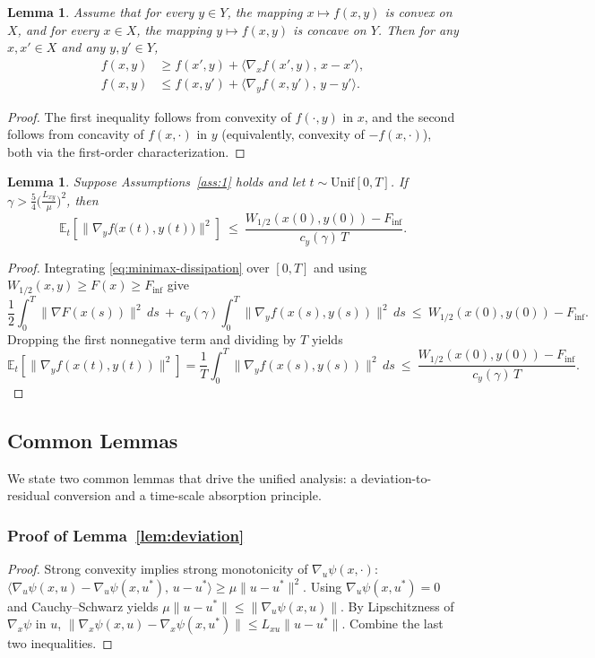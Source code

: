\documentclass{article}
\newtheorem{lemma}[theorem]{Lemma}
\newcommand{\1}{\mathbf{1}}
\begin{document}
\begin{lemma}\label{lem:support}
Assume that for every $y\in Y$, the mapping $x\mapsto f(x,y)$ is convex on $X$,
and for every $x\in X$, the mapping $y\mapsto f(x,y)$ is concave on $Y$.
Then for any $x,x'\in X$ and any $y,y'\in Y$,
\begin{align}
f(x,y) &\ge f(x',y)+\big\langle \nabla_x f(x',y),\,x-x'\big\rangle,
\label{eq:support-x}\\
f(x,y) &\le f(x,y')+\big\langle \nabla_y f(x,y'),\,y-y'\big\rangle.
\label{eq:support-y}
\end{align}
\end{lemma}

\begin{proof}
The first inequality follows from convexity of $f(\cdot,y)$ in $x$, and the second follows from concavity
of $f(x,\cdot)$ in $y$ (equivalently, convexity of $-f(x,\cdot)$), both via the first-order characterization.
\end{proof}

\begin{lemma}\label{lem:minimax-inner-residual}
Suppose Assumptions~\ref{ass:1} holds and let $t\sim\mathrm{Unif}[0,T]$.
If $\gamma>\frac{5}{4}\bigl(\frac{L_{xy}}{\mu}\bigr)^2$, then
\[
\mathbb E_t\!\left[\bigl\|\nabla_y f\bigl(x(t),y(t)\bigr)\bigr\|^{2}\right]
\ \le\
\frac{W_{1/2}(x(0),y(0)) - F_{\inf}}{c_y(\gamma)\,T}.
\]
\end{lemma}
\begin{proof}
Integrating \eqref{eq:minimax-dissipation} over $[0,T]$ and using $W_{1/2}(x,y)\ge F(x)\ge F_{\inf}$ give
\[
\frac12\int_0^T \|\nabla F(x(s))\|^2\,ds
\ +\ 
c_y(\gamma)\int_0^T \|\nabla_y f(x(s),y(s))\|^2\,ds
\ \le\
W_{1/2}(x(0),y(0)) - F_{\inf}.
\]
Dropping the first nonnegative term and dividing by $T$ yields
\[
\mathbb E_t\!\left[\|\nabla_y f(x(t),y(t))\|^2\right]
=
\frac{1}{T}\int_0^T \|\nabla_y f(x(s),y(s))\|^2\,ds
\ \le\
\frac{W_{1/2}(x(0),y(0)) - F_{\inf}}{c_y(\gamma)\,T}.
\]
\end{proof}

\subsection{Common Lemmas}
We state two common lemmas that drive the unified analysis: a deviation-to-residual conversion and a time-scale absorption principle.

\subsubsection{Proof of Lemma~\ref{lem:deviation}}
\begin{proof}
Strong convexity implies strong monotonicity of $\nabla_u\psi(x,\cdot)$:
$\langle \nabla_u\psi(x,u)-\nabla_u\psi(x,u^*),\,u-u^*\rangle\ge \mu\|u-u^*\|^2$.
Using $\nabla_u\psi(x,u^*)=0$ and Cauchy--Schwarz yields
$\mu\|u-u^*\|\le \|\nabla_u\psi(x,u)\|$.
By Lipschitzness of $\nabla_x\psi$ in $u$,
$\|\nabla_x\psi(x,u)-\nabla_x\psi(x,u^*)\|\le L_{xu}\|u-u^*\|$.
Combine the last two inequalities.
\end{proof}
\end{document}

